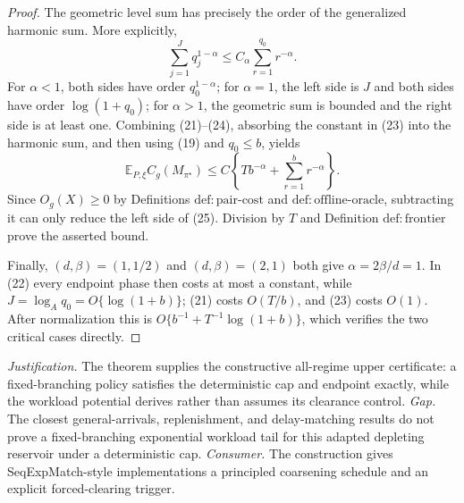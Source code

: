 \documentclass{article}
\begin{document}
\begin{proof}
The geometric level sum has precisely the order of the generalized harmonic sum.  More explicitly,
\[
 \sum_{j=1}^Jq_j^{1-\alpha}
 \le C_\alpha\sum_{r=1}^{q_0}r^{-\alpha}. \tag{24}
\]
For \(\alpha<1\), both sides have order \(q_0^{1-\alpha}\); for \(\alpha=1\), the left side is \(J\) and both sides have order \(\log(1+q_0)\); for \(\alpha>1\), the geometric sum is bounded and the right side is at least one.  Combining (21)--(24), absorbing the constant in (23) into the harmonic sum, and then using (19) and \(q_0\le b\), yields
\[
 \mathbb E_{P,\xi}C_g(M_{\pi^\star})
 \le C\left\{Tb^{-\alpha}+\sum_{r=1}^b r^{-\alpha}\right\}. \tag{25}
\]
Since \(O_g(X)\ge0\) by Definitions \(\mathrm{def:pair\text{-}cost}\) and \(\mathrm{def:offline\text{-}oracle}\), subtracting it can only reduce the left side of (25).  Division by \(T\) and Definition \(\mathrm{def:frontier}\) prove the asserted bound.

Finally, \((d,\beta)=(1,1/2)\) and \((d,\beta)=(2,1)\) both give \(\alpha=2\beta/d=1\).  In (22) every endpoint phase then costs at most a constant, while \(J=\log_Aq_0=O\{\log(1+b)\}\); (21) costs \(O(T/b)\), and (23) costs \(O(1)\).  After normalization this is \(O\{b^{-1}+T^{-1}\log(1+b)\}\), which verifies the two critical cases directly.
\end{proof}
\par\smallskip\noindent \textit{Justification.} The theorem supplies the constructive all-regime upper certificate: a fixed-branching policy satisfies the deterministic cap and endpoint exactly, while the workload potential derives rather than assumes its clearance control. \textit{Gap.} The closest general-arrivals, replenishment, and delay-matching results do not prove a fixed-branching exponential workload tail for this adapted depleting reservoir under a deterministic cap. \textit{Consumer.} The construction gives SeqExpMatch-style implementations a principled coarsening schedule and an explicit forced-clearing trigger.
\end{document}
